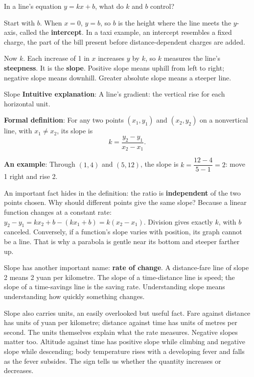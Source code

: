 In a line's equation $y = kx + b$, what do $k$ and $b$ control?

Start with $b$. When $x = 0$, $y = b$, so $b$ is the height where the line meets the $y$-axis, called the \textbf{intercept}. In a taxi example, an intercept resembles a fixed charge, the part of the bill present before distance-dependent charges are added.

Now $k$. Each increase of 1 in $x$ increases $y$ by $k$, so $k$ measures the line's \textbf{steepness}. It is the \textbf{slope}. Positive slope means uphill from left to right; negative slope means downhill. Greater absolute slope means a steeper line.

\begin{shuyu}{Slope}
\textbf{Intuitive explanation}: A line's gradient: the vertical rise for each horizontal unit.

\textbf{Formal definition}: For any two points $(x_1, y_1)$ and $(x_2, y_2)$ on a nonvertical line, with $x_1 \neq x_2$, its slope is
\[
k = \frac{y_2 - y_1}{x_2 - x_1}.
\]

\textbf{An example}: Through $(1, 4)$ and $(5, 12)$, the slope is $k = \dfrac{12 - 4}{5 - 1} = 2$: move 1 right and rise 2.
\end{shuyu}

An important fact hides in the definition: the ratio is \textbf{independent} of the two points chosen. Why should different points give the same slope? Because a linear function changes at a constant rate: $y_2 - y_1 = kx_2 + b - (kx_1 + b) = k(x_2 - x_1)$. Division gives exactly $k$, with $b$ canceled. Conversely, if a function's slope varies with position, its graph cannot be a line. That is why a parabola is gentle near its bottom and steeper farther up.

Slope has another important name: \textbf{rate of change}. A distance-fare line of slope 2 means 2 yuan per kilometre. The slope of a time-distance line is speed; the slope of a time-savings line is the saving rate. Understanding slope means understanding how quickly something changes.

Slope also carries units, an easily overlooked but useful fact. Fare against distance has units of yuan per kilometre; distance against time has units of metres per second. The units themselves explain what the rate measures. Negative slopes matter too. Altitude against time has positive slope while climbing and negative slope while descending; body temperature rises with a developing fever and falls as the fever subsides. The sign tells us whether the quantity increases or decreases.

